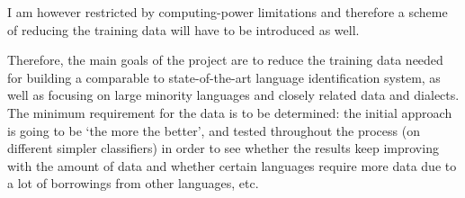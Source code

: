 I am however restricted by computing-power limitations and therefore a scheme of reducing the training data will have to be introduced as well.

Therefore, the main goals of the project are to reduce the training data needed for building a comparable to state-of-the-art language identification system, as well as focusing on large minority languages and closely related data and dialects. The minimum requirement for the data is to be determined: the initial approach is going to be `the more the better', and tested throughout the process (on different simpler classifiers) in order to see whether the results keep improving with the amount of data and whether certain languages require more data due to a lot of borrowings from other languages, etc.